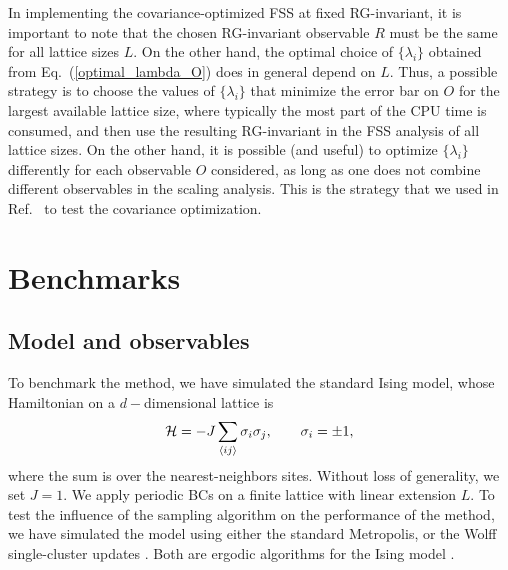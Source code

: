 \documentclass[pre,twocolumn]{revtex4-2}
\def\<{\langle}
\def\>{\rangle}
\begin{document}
In implementing the covariance-optimized FSS at fixed RG-invariant, it is important to note that the chosen RG-invariant observable $R$ must be the same for all lattice sizes $L$.
On the other hand, the optimal choice of $\{\lambda_i\}$ obtained from Eq.~(\ref{optimal_lambda_O}) does in general depend on $L$.
Thus, a possible strategy is to choose the values of $\{\lambda_i\}$ that minimize the error bar on $O$ for the largest available lattice size, where typically the most part of the CPU time is consumed, and then use the resulting RG-invariant in the FSS analysis of all lattice sizes.
On the other hand, it is possible (and useful) to optimize $\{\lambda_i\}$ differently for each observable $O$ considered, as long as one does not combine different observables in the scaling analysis.
This is the strategy that we used in Ref.~\cite{PT-11} to test the covariance optimization.



\section{Benchmarks}
\label{sec:benchmarks}
\subsection{Model and observables}
\label{sec:benchmarks:model}
To benchmark the method, we have simulated the standard Ising model, whose Hamiltonian on a $d-$dimensional lattice is
\begin{equation}
\label{ising}
{\cal H} = -J\sum_{\<ij\>}\sigma_i\sigma_j,\qquad \sigma_i=\pm 1,
\end{equation}
where the sum is over the nearest-neighbors sites. Without loss of generality, we set $J=1$.
We apply periodic BCs on a finite lattice with linear extension $L$.
To test the influence of the sampling algorithm on the performance of the method, we have simulated the model using either the standard Metropolis, or the Wolff single-cluster updates \cite{Wolff-89}.
Both are ergodic algorithms for the Ising model \cite{Sokal_lecture}.
\end{document}
